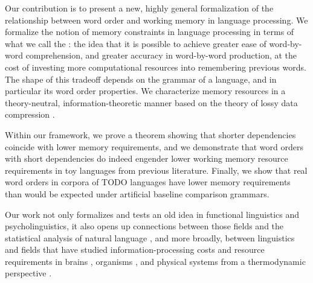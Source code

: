 Our contribution is to present a new, highly general formalization of the relationship between word order and working memory in language processing. We formalize the notion of memory constraints in language processing in terms of what we call the : the idea that it is possible to achieve greater ease of word-by-word comprehension, and greater accuracy in word-by-word production, at the cost of investing more computational resources into remembering previous words.
The shape of this tradeoff depends on the grammar of a language, and in particular its word order properties.
We characterize memory resources in a theory-neutral, information-theoretic manner based on the theory of lossy data compression \citep{cover2006elements,berger}. %


Within our framework, we prove a theorem showing that shorter dependencies coincide with lower memory requirements, and we demonstrate that word orders with short dependencies do indeed engender lower working memory resource requirements in toy languages from previous literature. Finally, we show that real word orders in corpora of TODO languages have lower memory requirements than would be expected under artificial baseline comparison grammars. 

Our work not only formalizes and tests an old idea in functional linguistics and psycholinguistics, it also opens up connections between those fields and the statistical analysis of natural language \citep{debowski-excess-2011,bentz2017word,lin-critical-2017}, and more broadly, between linguistics and fields that have studied information-processing costs and resource requirements in brains \citep{friston}, organisms \citep{england}, and physical systems from a thermodynamic perspective \citep{still2012thermodynamic}. %












